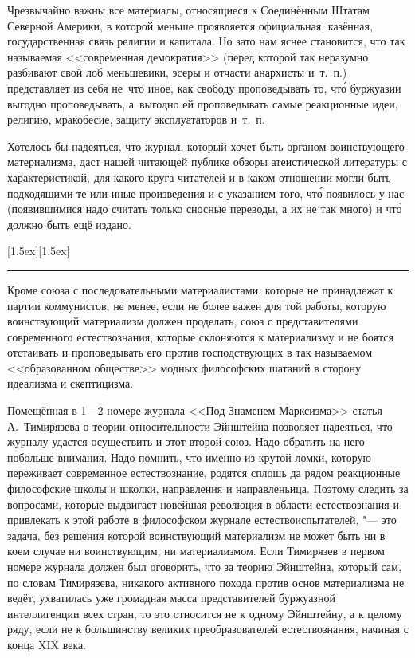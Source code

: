 Чрезвычайно важны все материалы, относящиеся к Соединённым Штатам Северной
Америки, в которой меньше проявляется официальная, казённая,
государственная связь религии и капитала. Но зато нам яснее становится, что
так называемая <<современная демократия>> (перед которой так неразумно
разбивают свой лоб меньшевики, эсеры и отчасти анархисты и~т.~п.)
представляет из себя не~что иное, как свободу проповедывать то, чт\'{о}
буржуазии выгодно проповедывать, а~выгодно ей проповедывать самые
реакционные идеи, религию, мракобесие, защиту эксплуататоров и~т.~п.

Хотелось бы надеяться, что журнал, который хочет быть органом воинствующего
материализма, даст нашей читающей публике обзоры атеистической литературы с
характеристикой, для какого круга читателей и в каком отношении могли быть
подходящими те или иные произведения и с указанием того, чт\'{о} появилось у
нас (появившимися надо считать только сносные переводы, а их не так много)
и чт\'{о} должно быть ещё издано.

{\centering \raisebox{0}[1.5ex][1.5ex]{\rule{0.9cm}{0.4pt}} \par}

Кроме союза с последовательными материалистами, которые не принадлежат к
партии коммунистов, не менее, если не более важен для той работы, которую
воинствующий материализм должен проделать, союз с представителями
современного естествознания, которые склоняются к материализму и не боятся
отстаивать и проповедывать его против господствующих в так называемом
<<образованном обществе>> модных философских шатаний в сторону идеализма и
скептицизма.

Помещённая в 1---2 номере журнала <<Под Знаменем Марксизма>> статья
А.~Тимирязева о теории относительности Эйнштейна
позволяет надеяться, что журналу удастся осуществить и этот второй союз.
Надо обратить на него побольше внимания. Надо помнить, что именно из крутой
ломки, которую переживает современное естествознание, родятся сплошь да
рядом реакционные философские школы и школки, направления и направленьица.
Поэтому следить за вопросами, которые выдвигает новейшая революция в
области естествознания и привлекать к этой работе в философском журнале
естествоиспытателей, "--- это задача, без решения которой воинствующий
материализм не может быть ни в коем случае ни воинствующим, ни
материализмом. Если Тимирязев в первом номере журнала должен был оговорить,
что за теорию Эйнштейна, который сам, по словам Тимирязева, никакого
активного похода против основ материализма не ведёт, ухватилась уже
громадная масса представителей буржуазной интеллигенции всех стран, то это
относится не к одному Эйнштейну, а к целому ряду, если не к большинству
великих преобразователей естествознания, начиная с конца XIX века.

